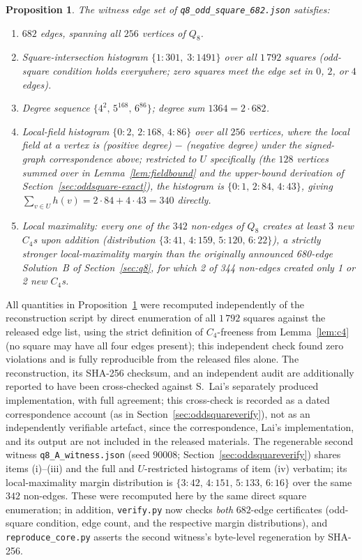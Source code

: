 \documentclass[12pt,a4paper]{article}
\newtheorem{proposition}[theorem]{Proposition}
\theoremstyle{definition}
\begin{document}
\begin{proposition}\label{prop:q8oddsquare}
The witness edge set of \texttt{q8\_odd\_square\_682.json} satisfies:
\begin{enumerate}[label=(\roman*)]
  \item $682$ edges, spanning all $256$ vertices of $Q_8$.
  \item Square-intersection histogram $\{1\!:\!301,\;3\!:\!1491\}$ over
    all $1\,792$ squares (odd-square condition holds everywhere; zero
    squares meet the edge set in $0$, $2$, or $4$ edges).
  \item Degree sequence $\{4^2,\,5^{168},\,6^{86}\}$; degree sum
    $1364=2\cdot682$.
  \item Local-field histogram $\{0\!:\!2,\,2\!:\!168,\,4\!:\!86\}$ over
    all $256$ vertices, where
    the local field at a vertex is (positive degree) $-$ (negative degree)
    under the signed-graph correspondence above; restricted to $U$
    specifically (the $128$ vertices summed over in
    Lemma~\ref{lem:fieldbound} and the upper-bound derivation of
    Section~\ref{sec:oddsquare-exact}), the histogram is
    $\{0\!:\!1,\,2\!:\!84,\,4\!:\!43\}$, giving
    $\sum_{v\in U}h(v)=2\cdot84+4\cdot43=340$ directly.
  \item Local maximality: every one of the $342$ non-edges of $Q_8$
    creates at least $3$ new $C_4$s upon addition (distribution
    $\{3\!:\!41,\,4\!:\!159,\,5\!:\!120,\,6\!:\!22\}$), a strictly stronger
    local-maximality margin than the originally announced 680-edge
    Solution~B of Section~\ref{sec:q8}, for which 2 of 344 non-edges
    created only 1 or 2 new $C_4$s.
\end{enumerate}
\end{proposition}

All quantities in Proposition~\ref{prop:q8oddsquare} were recomputed
independently of the reconstruction script by direct enumeration of all
$1\,792$ squares against the released edge list, using the strict
definition of $C_4$-freeness from Lemma~\ref{lem:c4} (no square may
have all four edges present); this independent check found zero violations
and is fully reproducible from the released files alone.
The reconstruction, its SHA-256 checksum, and an independent audit are
additionally reported to have been cross-checked against S.~Lai's
separately produced implementation, with full agreement; this
cross-check is recorded as a dated correspondence account (as in
Section~\ref{sec:oddsquareverify}), not as an independently verifiable
artefact, since the correspondence, Lai's implementation, and its
output are not included in the released materials. The regenerable
second witness \texttt{q8\_A\_witness.json} (seed $90008$;
Section~\ref{sec:oddsquareverify}) shares items (i)--(iii) and the full
and $U$-restricted histograms of item (iv) verbatim; its
local-maximality margin distribution is
$\{3{:}42,\,4{:}151,\,5{:}133,\,6{:}16\}$ over the same $342$
non-edges. These were recomputed here by the same direct square
enumeration; in addition, \texttt{verify.py} now checks \emph{both}
$682$-edge certificates (odd-square condition, edge count, and the
respective margin distributions), and \texttt{reproduce\_core.py}
asserts the second witness's byte-level regeneration by SHA-256.
\end{document}
